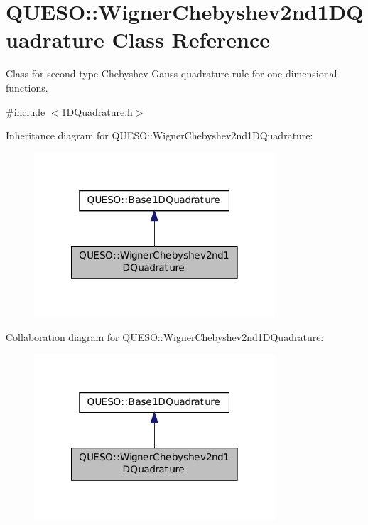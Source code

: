 \hypertarget{class_q_u_e_s_o_1_1_wigner_chebyshev2nd1_d_quadrature}{\section{Q\-U\-E\-S\-O\-:\-:Wigner\-Chebyshev2nd1\-D\-Quadrature Class Reference}
\label{class_q_u_e_s_o_1_1_wigner_chebyshev2nd1_d_quadrature}
}


Class for second type Chebyshev-\/\-Gauss quadrature rule for one-\/dimensional functions.  




{\ttfamily \#include $<$1\-D\-Quadrature.\-h$>$}



Inheritance diagram for Q\-U\-E\-S\-O\-:\-:Wigner\-Chebyshev2nd1\-D\-Quadrature\-:
\nopagebreak
\begin{figure}[H]
\begin{center}
\leavevmode
\includegraphics[width=254pt]{class_q_u_e_s_o_1_1_wigner_chebyshev2nd1_d_quadrature__inherit__graph}
\end{center}
\end{figure}


Collaboration diagram for Q\-U\-E\-S\-O\-:\-:Wigner\-Chebyshev2nd1\-D\-Quadrature\-:
\nopagebreak
\begin{figure}[H]
\begin{center}
\leavevmode
\includegraphics[width=254pt]{class_q_u_e_s_o_1_1_wigner_chebyshev2nd1_d_quadrature__coll__graph}
\end{center}
\end{figure}
